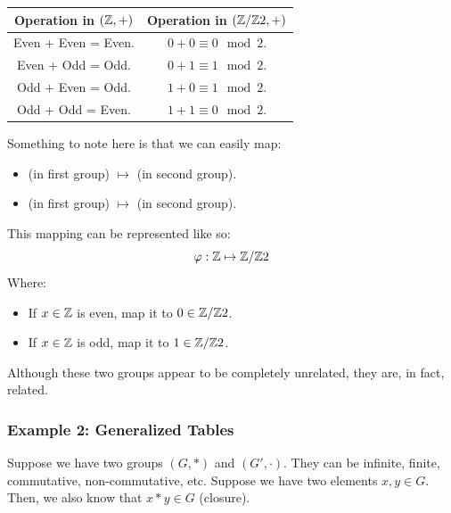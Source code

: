 \documentclass[letterpaper]{article}
\begin{document}
\begin{center}
    \begin{tabular}{c|c}
        Operation in $(\mathbb{Z}, +)$ & Operation in $(\mathbb{Z} / \mathbb{Z} 2, +)$ \\ 
        \hline 
        Even + Even = Even. & $0 + 0 \equiv 0 \mod{2}$. \\ 
        Even + Odd = Odd. & $0 + 1 \equiv 1 \mod{2}$. \\ 
        Odd + Even = Odd. & $1 + 0 \equiv 1 \mod{2}$. \\ 
        Odd + Odd = Even. & $1 + 1 \equiv 0 \mod{2}$.
    \end{tabular}
\end{center}

Something to note here is that we can easily map:
\begin{itemize}
    \item {} (in first group) $\mapsto$  (in second group).
    \item {} (in first group) $\mapsto$  (in second group).
\end{itemize}
This mapping can be represented like so: 
\[\varphi: \mathbb{Z} \mapsto \mathbb{Z} / \mathbb{Z} 2\]
Where: 
\begin{itemize}
    \item If $x \in \mathbb{Z}$ is even, map it to $0 \in \mathbb{Z} / \mathbb{Z} 2$. 
    \item If $x \in \mathbb{Z}$ is odd, map it to $1 \in \mathbb{Z} / \mathbb{Z} 2$. 
\end{itemize}
Although these two groups appear to be completely unrelated, they are, in fact, related. 

\subsubsection{Example 2: Generalized Tables}
Suppose we have two groups $(G, *)$ and $(G', \cdot)$. They can be infinite, finite, commutative, non-commutative, etc. Suppose we have two elements $x, y \in G$. Then, we also know that $x * y \in G$ (closure). 

\bigskip 
\end{document}
